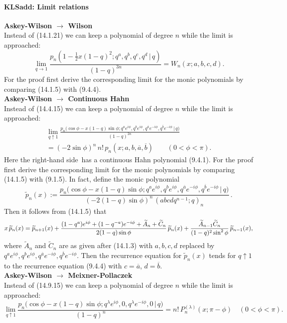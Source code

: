 \documentclass[envcountchap,graybox]{svmono}
\newcounter{rom}
\newcommand\ba{\bigskipamount}
\newcommand\bLP{\\[\ba]}
\newcommand\la\lambda
\newcommand\thalf{\tfrac12}
\newcommand\wt{\widetilde}
\newcommand\RHS{right-hand side}
\begin{document}
\paragraph{\large\bf KLSadd: Limit relations}{\bf Askey-Wilson $\longrightarrow$ Wilson}\\
Instead of (14.1.21) we can keep a polynomial of degree $n$ while the limit is approached:
\begin{equation}
\lim_{q\to1}\frac{p_n(1-\thalf x(1-q)^2;q^a,q^b,q^c,q^d\,|\, q)}{(1-q)^{3n}}
=W_n(x;a,b,c,d).
\label{109}
\end{equation}
For the proof first derive the corresponding limit for the monic polynomials by comparing
(14.1.5) with (9.4.4).
\bLP
{\bf Askey-Wilson $\longrightarrow$ Continuous Hahn}\\
Instead of (14.4.15) we can keep a polynomial of degree $n$ while the limit is approached:
\begin{multline}
\lim_{q\uparrow1}
\frac{p_n\big(\cos\phi-x(1-q)\sin\phi;q^a e^{i\phi},q^b e^{i\phi},q^{\overline a} e^{-i\phi},
q^{\overline b} e^{-i\phi}\,|\, q\big)}
{(1-q)^{2n}}\\
=(-2\sin\phi)^n\,n!\,p_n(x;a,b,\overline a,\overline b)\qquad
(0<\phi<\pi).
\label{177}
\end{multline}
Here the \RHS\ has a continuous Hahn polynomial (9.4.1).
For the proof first derive the corresponding limit for the monic polynomials by comparing
(14.1.5) with (9.1.5).
In fact, define the monic polynomial
\[
\wt p_n(x):=
\frac{p_n\big(\cos\phi-x(1-q)\sin\phi;q^a e^{i\phi},q^b e^{i\phi},q^{\overline a} e^{-i\phi},
q^{\overline b} e^{-i\phi}\,|\, q\big)}
{(-2(1-q)\sin\phi)^n\,(abcdq^{n-1};q)_n}\,.
\]
Then it follows from (14.1.5) that
\begin{equation*}
x\,\wt p_n(x)=\wt p_{n+1}(x)
+\frac{(1-q^a)e^{i\phi}+(1-q^{-a})e^{-i\phi}+\wt A_n+\wt C_n}{2(1-q)\sin\phi}\,\wt p_n(x)\\
+\frac{\wt A_{n-1} \wt C_n}{(1-q)^2 \sin^2\phi}\,\wt p_{n-1}(x),
\end{equation*}
where $\wt A_n$ and $\wt C_n$ are as given after (14.1.3) with $a,b,c,d$ replaced by
$q^a e^{i\phi},q^b e^{i\phi},q^{\overline a} e^{-i\phi},q^{\overline b} e^{-i\phi}$.
Then the recurrence equation for $\wt p_n(x)$ tends for $q\uparrow 1$ to
the recurrence equation (9.4.4) with $c=\overline a$, $d=\overline b$.
\bLP
{\bf Askey-Wilson $\longrightarrow$ Meixner-Pollaczek}\\
Instead of (14.9.15) we can keep a polynomial of degree $n$ while the limit is approached:
\begin{equation}
\lim_{q\uparrow1}
\frac{p_n\big(\cos\phi-x(1-q)\sin\phi;
q^\la e^{i\phi},0,q^\la e^{-i\phi},0\,|\, q\big)}{(1-q)^n}
=n!\,P_n^{(\la)}(x;\pi-\phi)\quad
(0<\phi<\pi).
\label{178}
\end{equation}
\end{document}
